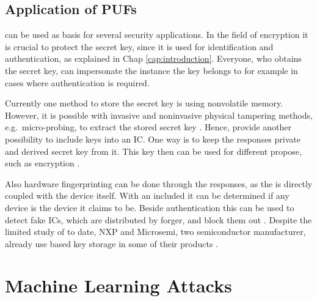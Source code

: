 \subsection{Application of PUFs}
\label{sec:applicationsofpufs}

\pufs can be used as basis for several security applications.
In the field of encryption it is crucial to protect the secret key, since it is used for identification and authentication, as explained in Chap \ref{cap:introduction}.
Everyone, who obtains the secret key, can impersonate the instance the key belongs to for example in cases where  authentication is required.

Currently one method to store the secret key is using nonvolatile memory.
However, it is possible with invasive and noninvasive physical tampering methods, e.g.\ micro-probing, to extract the stored secret key \cite{Lim2005ExtractingCircuits}. %
Hence, \pufs provide another possibility to include keys into an \ac{IC}.
One way is to keep the \puf responses private and derived secret key from it.
This key then can be used for different propose, such as encryption \cite{Tajik2014PhysicalPUFs}.

Also hardware fingerprinting can be done through the \puf responses, as the \puf is directly coupled with the device itself.
With an included \puf it can be determined if any device is the device it claims to be. %
Beside authentication this can be used to detect fake \acp{IC}, which are distributed by forger, and block them out \cite{Machida2015ImplementationFPGA}.
Despite the limited study of \pufs to date, \ac{NXP} and Microsemi, two semiconductor manufacturer, already use \puf based key storage in some of their products \cite{Becker2015ThePUFs}.



\section{Machine Learning Attacks}

